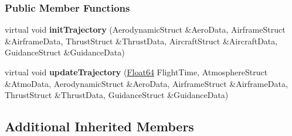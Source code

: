 \subsubsection*{Public Member Functions}
\begin{DoxyCompactItemize}
\item 
virtual void {\bfseries init\+Trajectory} (Aerodynamic\+Struct \&Aero\+Data, Airframe\+Struct \&Airframe\+Data, Thrust\+Struct \&Thrust\+Data, Aircraft\+Struct \&Aircraft\+Data, Guidance\+Struct \&Guidance\+Data)
\item 
virtual void {\bfseries update\+Trajectory} (\hyperlink{group___tools_ga3f1431cb9f76da10f59246d1d743dc2c}{Float64} Flight\+Time, Atmosphere\+Struct \&Atmo\+Data, Aerodynamic\+Struct \&Aero\+Data, Airframe\+Struct \&Airframe\+Data, Thrust\+Struct \&Thrust\+Data, Guidance\+Struct \&Guidance\+Data)
\end{DoxyCompactItemize}
\subsection*{Additional Inherited Members}
